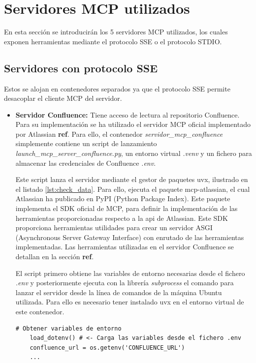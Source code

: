 \section{Servidores MCP utilizados}
En esta sección se introducirán los 5 servidores MCP utilizados, los cuales exponen herramientas mediante el protocolo SSE o el protocolo STDIO. 

\subsection{Servidores con protocolo SSE}
Estos se alojan en contenedores separados ya que el protocolo SSE permite desacoplar el cliente MCP del servidor.
\begin{itemize}
  \item\textbf{Servidor Confluence: }Tiene acceso de lectura al repositorio Confluence. Para su implementación se ha utilizado el servidor MCP oficial implementado por Atlassian \textbf{ref}. Para ello, el contenedor \textit{servidor\_mcp\_confluence} simplemente contiene un script de lanzamiento \textit{launch\_mcp\_server\_confluence.py}, un entorno virtual \textit{.venv} y un fichero para almacenar las credenciales de Confluence \textit{.env}. 

    Este script lanza el servidor mediante el gestor de paquetes uvx, ilustrado en el listado \ref{lst:check_data}. Para ello, ejecuta el paquete mcp-atlassian, el cual Atlassian ha publicado en PyPI (Python Package Index). Este paquete implementa el SDK oficial de MCP, para definir la implementación de las herramientas proporcionadas respecto a la api de Atlassian. Este SDK proporciona herramientas utilidades para crear un servidor ASGI (Asynchronous Server Gateway Interface) con enrutado de las herramientas implementadas. Las herramientas utilizadas en el servidor Confluence se detallan en la sección \textbf{ref}.  

El script primero obtiene las variables de entorno necesarias desde el fichero \textit{.env} y posteriormente ejecuta con la librería \textit{subprocess} el comando para lanzar el servidor desde la línea de comandos de la máquina Ubuntu utilizada. Para ello es necesario tener instalado uvx en el entorno virtual de este contenedor.
\begin{lstlisting}[caption={Ejecución del lanzamiento de servidor MCP Confluence con uvx},label={lst:check_data}]
    # Obtener variables de entorno
    load_dotenv() # <- Carga las variables desde el fichero .env
    confluence_url = os.getenv('CONFLUENCE_URL')
    ...


\end{lstlisting}
\end{itemize}
